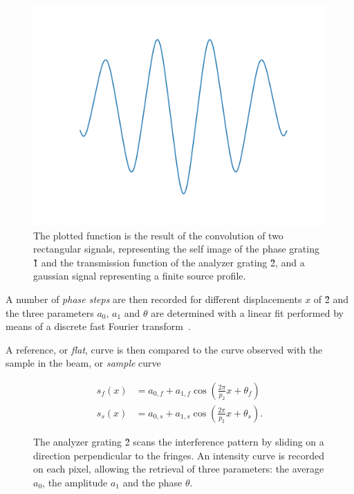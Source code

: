 \begin{figure}[htb]
    \centering
    \includegraphics[width=\textwidth]{gfx/sinusoidal-phase-stepping/sinusoidal-phase-stepping.png}
    \caption[Convolution of two rectangular and a gaussian signal.]{The
        plotted function is the result of the convolution of two rectangular
        signals, representing the self image of the phase grating \G1 and the
        transmission function of the analyzer grating \G2, and a gaussian
    signal representing a finite source profile.}
    \label{fig:phase.stepping.sinusoidal}
\end{figure}


A number of \emph{phase steps} are then recorded for different displacements
$x$ of \G2 and the three parameters $a_0$, $a_1$ and $\theta$ are determined
with a linear fit performed by means of a discrete fast Fourier transform~\cite{FFTEquivalence}.

A reference, or \emph{flat}, curve is then compared to the curve observed
with the sample in the beam, or \emph{sample} curve

\begin{align}
    s_f(x) &= a_{0,f} + a_{1,f} \cos\left(\frac{2 \pi}{p_2} x + \theta_{f}\right)\\
    s_s(x) &= a_{0,s} + a_{1,s} \cos\left(\frac{2 \pi}{p_2} x +
    \theta_{s}\right).
    \label{eq:flat}
\end{align}

\begin{figure}[htb]
    \centering
    
    \caption[Phase stepping curve.]{The analyzer grating \G{2} scans the
    interference pattern by sliding on a direction perpendicular to the
    fringes. An intensity curve is recorded on each pixel, allowing the
    retrieval of three parameters: the average $a_0$, the amplitude $a_1$
and the phase $\theta$.}
    \label{fig:phase.stepping}
\end{figure}

